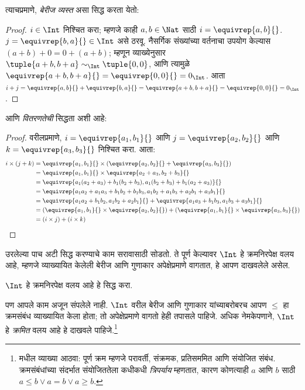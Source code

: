 \documentclass[../../../include/open-logic-section]{subfiles}
\begin{document}
त्याचप्रमाणे, \emph{बेरीज व्यस्त} असा सिद्ध करता येतो:

\begin{proof}
$i \in \Int$ निश्चित करा; म्हणजे काही $a,b \in \Nat$ साठी $i =
\equivrep{a,b}{}$. $j = \equivrep{b,a}{} \in \Int$ असे ठरवू. नैसर्गिक
संख्यांच्या वर्तनाचा उपयोग केल्यास $(a+b) + 0 = 0 + (a+b)$; म्हणून
व्याख्येनुसार $\tuple{a+b, b+a} \sim_\Int \tuple{0,0}$, आणि त्यामुळे
$\equivrep{a+b, b+a}{} = \equivrep{0, 0}{} = 0_\Int$. आता $i + j =
\equivrep{a,b}{}+\equivrep{b,a}{}=\equivrep{a+b, b+a}{}= \equivrep{0,
0}{} = 0_\Int$.
\end{proof}

आणि \emph{वितरणतेची} सिद्धता अशी आहे:

\begin{proof}
वरीलप्रमाणे, $i = \equivrep{a_1, b_1}{}$ आणि $j =
\equivrep{a_2,b_2}{}$ आणि $k = \equivrep{a_3, b_3}{}$ निश्चित करा. आता:
\begin{align*}
	i \times (j + k)
	&= \equivrep{a_1, b_1}{} \times (\equivrep{a_2,b_2}{} + \equivrep{a_3, b_3}{})\\
	&= \equivrep{a_1, b_1}{} \times \equivrep{a_2 + a_3,b_2+b_3}{}\\
	&= \equivrep{a_1  (a_2 + a_3) + b_1  (b_2+b_3), a_1  (b_2 + b_3) + b_1 (a_2 + a_3)}{}\\
	&= \equivrep{a_1 a_2 + a_1a_3 + b_1 b_2+b_1b_3, a_1 b_2 + a_1b_3 + a_2b_1 + a_3b_1}{}\\		
	&= \equivrep{a_1a_2 + b_1b_2, a_1b_2 + a_2b_1}{} + \equivrep{a_1a_3 + b_1b_3, a_1b_3 + a_3b_1}{}\\
	&= (\equivrep{a_1, b_1}{} \times \equivrep{a_2,b_2}{}) + (\equivrep{a_1, b_1}{} \times  \equivrep{a_3, b_3}{})\\
	&= (i \times j) + (i \times k)
\end{align*}
\end{proof}

उरलेल्या पाच अटी सिद्ध करण्याचे काम सरावासाठी सोडतो. ते पूर्ण केल्यावर
$\Int$ हे क्रमनिरपेक्ष वलय आहे, म्हणजे व्याख्यायित केलेली बेरीज आणि
गुणाकार अपेक्षेप्रमाणे वागतात, हे आपण दाखवलेले असेल.

\begin{prob}
$\Int$ हे क्रमनिरपेक्ष वलय आहे हे सिद्ध करा.
\end{prob}

पण आपले काम अजून संपलेले नाही. $\Int$ वरील बेरीज आणि गुणाकार यांच्याबरोबरच
आपण $\leq$ हा क्रमसंबंध व्याख्यायित केला होता; तो अपेक्षेप्रमाणे वागतो हेही
तपासले पाहिजे. अधिक नेमकेपणाने, $\Int$ हे \emph{क्रमित} वलय आहे हे दाखवले
पाहिजे.\footnote{ मधील व्याख्या आठवा:
	पूर्ण क्रम म्हणजे परावर्ती, संक्रमक, प्रतिसममित आणि संयोजित संबंध.
	क्रमसंबंधांच्या संदर्भात संयोजिततेला कधीकधी \emph{त्रिपर्याय} म्हणतात,
	कारण कोणत्याही $a$ आणि $b$ साठी $a \leq b \lor a
	= b \lor a \geq b$.}
\end{document}
